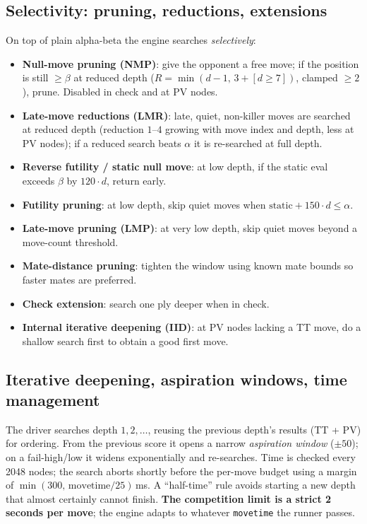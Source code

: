 \documentclass[11pt]{article}
\newcommand{\code}[1]{\texttt{#1}}
\begin{document}
\subsection{Selectivity: pruning, reductions, extensions}
On top of plain alpha-beta the engine searches \emph{selectively}:
\begin{itemize}[nosep]
  \item \textbf{Null-move pruning (NMP)}: give the opponent a free move; if the
        position is still $\ge\beta$ at reduced depth ($R=\min(d{-}1,\,3{+}[d\!\ge\!7])$,
        clamped $\ge2$), prune. Disabled in check and at PV nodes.
  \item \textbf{Late-move reductions (LMR)}: late, quiet, non-killer moves are
        searched at reduced depth (reduction $1$--$4$ growing with move index and
        depth, less at PV nodes); if a reduced search beats $\alpha$ it is
        re-searched at full depth.
  \item \textbf{Reverse futility / static null move}: at low depth, if the static
        eval exceeds $\beta$ by $120\cdot d$, return early.
  \item \textbf{Futility pruning}: at low depth, skip quiet moves when
        $\text{static}+150\cdot d \le \alpha$.
  \item \textbf{Late-move pruning (LMP)}: at very low depth, skip quiet moves
        beyond a move-count threshold.
  \item \textbf{Mate-distance pruning}: tighten the window using known mate
        bounds so faster mates are preferred.
  \item \textbf{Check extension}: search one ply deeper when in check.
  \item \textbf{Internal iterative deepening (IID)}: at PV nodes lacking a TT
        move, do a shallow search first to obtain a good first move.
\end{itemize}

\subsection{Iterative deepening, aspiration windows, time management}
The driver searches depth $1,2,\dots$, reusing the previous depth's results
(TT + PV) for ordering. From the previous score it opens a narrow
\emph{aspiration window} ($\pm 50$); on a fail-high/low it widens exponentially
and re-searches. Time is checked every 2048 nodes; the search aborts shortly
before the per-move budget using a margin of $\min(300,\,\text{movetime}/25)$\,ms.
A ``half-time'' rule avoids starting a new depth that almost certainly cannot
finish. \textbf{The competition limit is a strict 2 seconds per move}; the engine
adapts to whatever \code{movetime} the runner passes.
\end{document}
